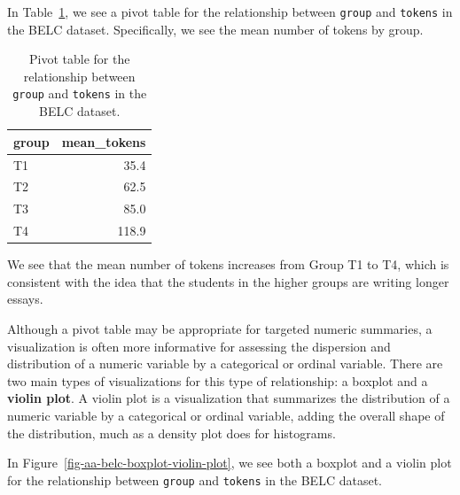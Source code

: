 \documentclass[
  letterpaper,
  DIV=11,
  numbers=noendperiod]{scrreport}
\theoremstyle{definition}
\theoremstyle{remark}
\begin{document}
In Table~\ref{tbl-aa-belc-pivot-table}, we see a pivot table for the
relationship between \texttt{group} and \texttt{tokens} in the BELC
dataset. Specifically, we see the mean number of tokens by group.

\hypertarget{tbl-aa-belc-pivot-table}{}
\begin{table}
\caption{\label{tbl-aa-belc-pivot-table}Pivot table for the relationship between \texttt{group} and
\texttt{tokens} in the BELC dataset. }\tabularnewline

\centering
\begin{tabular}{l|r}
\hline
group & mean\_tokens\\
\hline
T1 & 35.4\\
\hline
T2 & 62.5\\
\hline
T3 & 85.0\\
\hline
T4 & 118.9\\
\hline
\end{tabular}
\end{table}

We see that the mean number of tokens increases from Group T1 to T4,
which is consistent with the idea that the students in the higher groups
are writing longer essays.

Although a pivot table may be appropriate for targeted numeric
summaries, a visualization is often more informative for assessing the
dispersion and distribution of a numeric variable by a categorical or
ordinal variable. There are two main types of visualizations for this
type of relationship: a boxplot and a \textbf{violin plot}. A violin
plot is a visualization that summarizes the distribution of a numeric
variable by a categorical or ordinal variable, adding the overall shape
of the distribution, much as a density plot does for histograms.

In Figure~\ref{fig-aa-belc-boxplot-violin-plot}, we see both a boxplot
and a violin plot for the relationship between \texttt{group} and
\texttt{tokens} in the BELC dataset.
\end{document}
